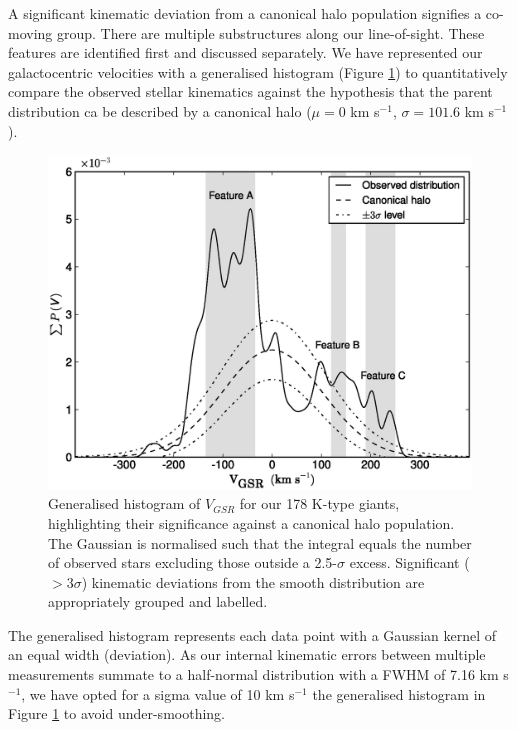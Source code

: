 \documentclass[preprint2]{aastex}
\begin{document}
A significant kinematic deviation from a canonical halo population signifies a co-moving group. There are multiple substructures along our line-of-sight. These features are identified first and discussed separately. We have represented our galactocentric velocities with a generalised histogram (Figure \ref{fig:velocity-histogram}) to quantitatively compare the observed stellar kinematics against the hypothesis that the parent distribution ca be described by a canonical halo ($\mu = 0$ km s$^{-1}$, $\sigma = 101.6$ km s$^{-1}$ \citep{Sirko;et-al_2004}).

	\begin{figure}[h!]
		\includegraphics[width=\columnwidth]{./velocity_halo.eps}
		\caption{Generalised histogram of $V_{GSR}$ for our 178 K-type giants, highlighting their significance against a canonical halo population. The Gaussian is normalised such that the integral equals the number of observed stars excluding those outside a 2.5-$\sigma$ excess. Significant ($>3\sigma$) kinematic deviations from the smooth distribution are appropriately grouped and labelled.}
		\label{fig:velocity-histogram}
	\end{figure}
	
The generalised histogram represents each data point with a Gaussian kernel of an equal width (deviation). As our internal kinematic errors between multiple measurements summate to a half-normal distribution with a FWHM of 7.16 km s$^{-1}$, we have opted for a sigma value of 10 km s$^{-1}$ the generalised histogram in Figure \ref{fig:velocity-histogram} to avoid under-smoothing.
\end{document}

